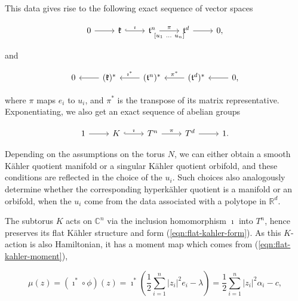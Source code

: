 \documentclass{amsart}
\newcommand{\RR}{\mathbb{R}}
\newcommand{\CC}{\mathbb{C}}
\newcommand{\mfk}{\mathfrak{k}}
\newcommand{\mft}{\mathfrak{t}}
\begin{document}
    This data gives rise to the following exact sequence of vector spaces
    
    \begin{equation}\label{eqn:lie-algebra-seq}
        \begin{tikzcd}[ampersand replacement=\&]
            0 \ar[r] \& \mfk \ar[r, hook, "\imath"] \& \mft^{n} \arrow{r}{\pi}[swap]{[u_{1}\ \ldots \ u_{n}]} \& \mft^{d} \ar[r] \& 0,
        \end{tikzcd}
    \end{equation}
    
    and
    
    \begin{equation}\label{eqn:dual-lie-algebra-seq}
        \begin{tikzcd}[ampersand replacement=\&]
            0 \& \ar[l]	(\mfk)^{\ast} \& \ar[l, "\imath^{\ast}", swap] (\mft^{n})^{\ast} \& \arrow{l}[swap]{\pi^{\ast}} (\mft^{d})^{\ast} \& \ar[l] 0,
        \end{tikzcd}
    \end{equation}
    
    where $\pi$ maps $e_{i}$ to $u_{i}$, and $\pi^{\ast}$ is the transpose of its matrix representative. Exponentiating, we also get an exact sequence of abelian groups
    
    \begin{equation}\label{eqn:lie-group-seq}
        \begin{tikzcd}[ampersand replacement=\&]
            1 \ar[r] \& K \ar[r, hook, "\imath"] \& T^{n} \arrow{r}{\pi} \& T^{d} \ar[r] \& 1.
        \end{tikzcd}
    \end{equation}
    
    Depending on the assumptions on the torus $N$, we can either obtain a smooth K\"ahler quotient manifold or a singular K\"ahler quotient orbifold, and these conditions are reflected in the choice of the $u_{i}$. Such choices also analogously determine whether the corresponding hyperk\"ahler quotient is a manifold or an orbifold, when the $u_{i}$ come from the data associated with a polytope in $\RR^{d}$.
    
    The subtorus $K$ acts on $\CC^{n}$ via the inclusion homomorphism $\imath$ into $T^{n}$, hence preserves its flat K\"ahler structure and form (\ref{eqn:flat-kahler-form}). As this $K$-action is also Hamiltonian, it has a moment map which comes from (\ref{eqn:flat-kahler-moment}),
    
    \begin{equation}\label{eqn:K-moment-map}
        \mu(z) = (\imath^{\ast} \circ \phi)(z) = \imath^{\ast} \left(\frac{1}{2}\sum_{i=1}^{n}|z_{i}|^{2}e_{i} - \lambda\right) = \frac{1}{2}\sum_{i=1}^{n}|z_{i}|^{2}\alpha_{i} - c,
    \end{equation}
\end{document}
